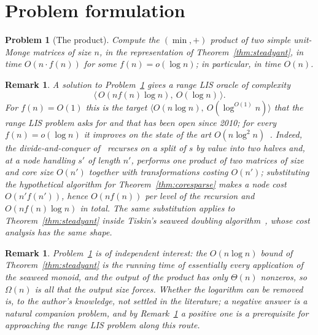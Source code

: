 \documentclass[10pt]{article}
\newtheorem{problem}{Problem}
\newtheorem{remark}[theorem]{Remark}
\newcommand{\poly}{\log^{O(1)}}
\begin{document}
\section{Problem formulation}

\begin{problem}[The product]\label{prob:product}
Compute the $(\min,+)$ product of two simple unit-Monge matrices of size $n$,
in the representation of Theorem~\ref{thm:steadyant}, in time $O(n\cdot f(n))$
for some $f(n)=o(\log n)$; in particular, in time $O(n)$.
\end{problem}

\begin{remark}\label{rem:productimplies}
A solution to Problem~\ref{prob:product} gives a range LIS oracle of
complexity
\[
\bigl\langle\, O(n f(n)\log n),\ O(\log n)\,\bigr\rangle .
\]
For $f(n)=O(1)$ this is the target
$\bigl\langle O(n\log n),\ O(\poly n)\bigr\rangle$ that the range LIS
problem asks for and that has been open since 2010; for every
$f(n)=o(\log n)$ it improves on the state of the art
$O(n\log^2n)$~\cite{Tiskin15,TiskinArXiv,GGK25}. Indeed, the divide-and-conquer of~\cite[Section
5]{GGK25} recurses on a split of $s$ by value into two halves and, at a node
handling $s'$ of length $n'$, performs one product of two matrices of size and
core size $O(n')$ together with transformations costing $O(n')$; substituting
the hypothetical algorithm for Theorem~\ref{thm:coresparse} makes a node cost
$O(n'f(n'))$, hence $O(nf(n))$ per level of the recursion and
$O(nf(n)\log n)$ in total. The same substitution applies to
Theorem~\ref{thm:steadyant} inside Tiskin's seaweed doubling
algorithm~\cite[Algorithm 8.2]{TiskinArXiv}, whose cost analysis has the same
shape.
\end{remark}

\begin{remark}\label{rem:productstatus}
Problem~\ref{prob:product} is of independent interest: the $O(n\log n)$ bound of
Theorem~\ref{thm:steadyant} is the running time of essentially every
application of the seaweed monoid, and the output of the product has only
$\Theta(n)$ nonzeros, so $\Omega(n)$ is all that the output size forces.
Whether the logarithm can be removed is, to the author's knowledge, not settled
in the literature; a negative answer is a natural companion problem, and by
Remark~\ref{rem:productimplies} a positive one is a prerequisite for
approaching the range LIS problem along this route.
\end{remark}
\end{document}
